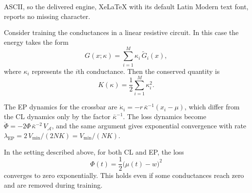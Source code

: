 \documentclass[10pt,a4paper]{amsart}
\begin{document}
ASCII, so the delivered engine, XeLaTeX with its default Latin Modern text font, reports no missing character.
\begin{theorem}
    Consider training the conductances in a linear resistive circuit.  
    In this case the energy takes the form
    \[
        G(x;\kappa) = \sum_{i=1}^{M} \kappa_i\,\widetilde{G}_i(x),
    \]
    where $\kappa_i$ represents the $i$th conductance.
    Then the conserved quantity is
    \[
        K(\kappa) = \frac{1}{2}\sum_{i=1}^{M} \kappa_i^2.
    \]
    \label{Thm:Cond}
\end{theorem}

\begin{remark}
The EP dynamics for the crossbar are
$\dot{\kappa}_i = -r\,\bar{\kappa}^{-1}(x_i - \mu)$,
which differ from the CL dynamics only by the factor $\bar{\kappa}^{-1}$.
The loss dynamics become
$\dot{\Phi} = -2\Phi\,\bar{\kappa}^{-2}\,V_{\mathcal{A}}$,
and the same argument gives exponential convergence with rate
$\lambda_{\mathrm{EP}} = 2\,V_{\min}/(2NK) = V_{\min}/(NK)$.
\label{Rmk:EP_Crossbar}
\end{remark}

\begin{theorem}\label{thm:crossbar}                   
  In the setting described above, for both CL and EP, the loss                 
  \[\Phi(t) = \dfrac{1}{2}\big(\mu(t) - w\big)^2 \]
  converges to zero exponentially. This holds even if some conductances reach
  zero and are removed during training.
  \end{theorem}
\end{document}
